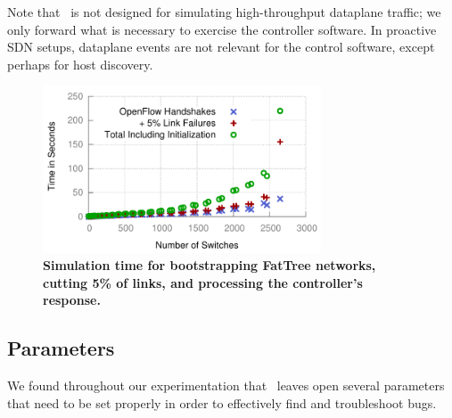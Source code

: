 Note that \projectname~is not designed for simulating high-throughput dataplane
traffic; we only forward what is necessary to exercise the controller
software. In proactive SDN setups, dataplane events are not
relevant for the control software, except perhaps for host discovery.

\begin{figure}[t]
    \includegraphics[width=3.25in]{../graphs/scalability/scaling.pdf}
    \caption[]{\label{fig:scaling}\textbf{Simulation time for bootstrapping FatTree
    networks, cutting 5\% of links, and processing the controller's
    response.}}
\end{figure}

\subsection{Parameters}
\label{subsec:params}

We found throughout our experimentation that \projectname~leaves open several
parameters that need to be set properly in order to effectively find and troubleshoot bugs.

